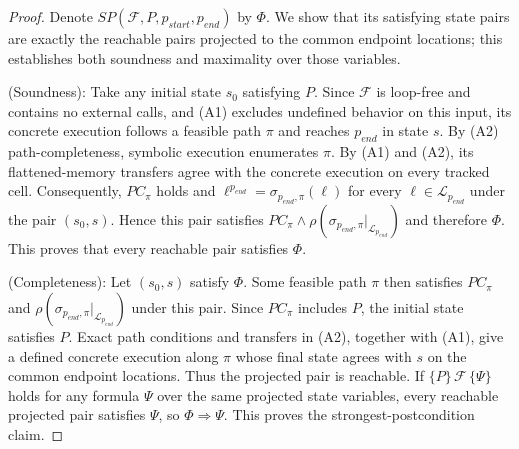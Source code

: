 \begin{proof}
    Denote $\textit{SP}(\mathcal{F},P,p_{\textit{start}},p_{\textit{end}})$ by $\Phi$. {We show that its satisfying state pairs are exactly the reachable pairs projected to the common endpoint locations; this establishes both soundness and maximality over those variables.}

    (Soundness): Take any initial state $s_0$ satisfying $P$. Since $\mathcal{F}$ is loop-free and contains no external calls, {and (A1) excludes undefined behavior on this input,} its concrete execution follows a feasible path $\pi$ and reaches $p_{\textit{end}}$ in state $s$. By (A2) path-completeness, symbolic execution enumerates $\pi$. By (A1) and (A2), its flattened-memory transfers agree with the concrete execution on every tracked cell. {Consequently, $PC_\pi$ holds and $\ell^{p_{\textit{end}}}=\sigma_{p_{\textit{end}},\pi}(\ell)$ for every $\ell\in\mathcal L_{p_{\textit{end}}}$ under the pair $(s_0,s)$. Hence this pair satisfies $PC_\pi\land\rho(\sigma_{p_{\textit{end}},\pi}|_{\mathcal L_{p_{\textit{end}}}})$ and therefore $\Phi$. This proves that every reachable pair satisfies $\Phi$.}

    (Completeness): {Let $(s_0,s)$ satisfy $\Phi$. Some feasible path $\pi$ then satisfies $PC_\pi$ and $\rho(\sigma_{p_{\textit{end}},\pi}|_{\mathcal L_{p_{\textit{end}}}})$ under this pair. Since $PC_\pi$ includes $P$, the initial state satisfies $P$. Exact path conditions and transfers in (A2), together with (A1), give a defined concrete execution along $\pi$ whose final state agrees with $s$ on the common endpoint locations. Thus the projected pair is reachable. If $\{P\}\,\mathcal{F}\,\{\Psi\}$ holds for any formula $\Psi$ over the same projected state variables, every reachable projected pair satisfies $\Psi$, so $\Phi\Rightarrow\Psi$. This proves the strongest-postcondition claim.}
\end{proof}
